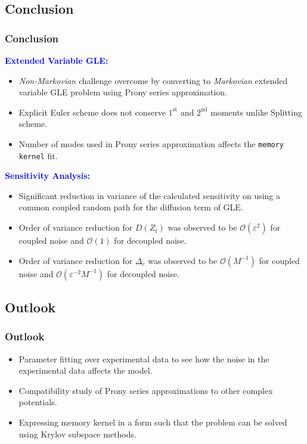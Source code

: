 \documentclass[a4paper,10pt]{beamer}
\newcommand{\rb}[1]{\left( #1 \right)}
\begin{document}
	\begin{frame}
		\section{Conclusion}
		\frametitle{Conclusion}
		\textcolor{blue}{\textbf{Extended Variable GLE:}}
		\begin{itemize}
			\item {\textit{Non-Markovian} challenge overcome by converting to \textit{Markovian} extended variable GLE problem using Prony series approximation.}
			\item {Explicit Euler scheme does not conserve $1^{\text{st}}$ and $2^{\text{nd}}$ moments unlike Splitting scheme.}
			\item {Number of modes used in Prony series approximation affects the \texttt{memory kernel} fit.}
		\end{itemize}
		\textcolor{blue}{\textbf{Sensitivity Analysis:}}
		\begin{itemize}
			\item {Significant reduction in variance of the calculated sensitivity on using a common coupled random path for the diffusion term of GLE.}
			\item {Order of variance reduction for $D\rb{Z_{t}}$ was observed to be $\mathcal{O}\rb{\varepsilon^{2}}$ for coupled noise and $\mathcal{O}\rb{1}$ for decoupled noise.}
			\item {Order of variance reduction for $\Delta_{c}$ was observed to be $\mathcal{O}\rb{M^{-1}}$ for coupled noise and $\mathcal{O}\rb{\varepsilon^{-2}M^{-1}}$ for decoupled noise.}
		\end{itemize}
	\end{frame}

	\begin{frame}
		\section{Outlook}
		\frametitle{Outlook}
		\large
		\begin{itemize}
			\item {Parameter fitting over experimental data to see how the noise in the experimental data affects the model.}
			\item {Compatibility study of Prony series approximations to other complex potentials.}
			\item {Expressing memory kernel in a form such that the problem can be solved using Krylov subspace methods.}
		\end{itemize}
	\end{frame}
		
\end{document}
